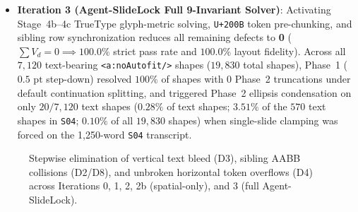 \documentclass[10pt,journal,compsoc]{IEEEtran}
\begin{document}
\begin{itemize}
    \item \textbf{Iteration 3 (Agent-SlideLock Full 9-Invariant Solver)}: Activating Stage~4b--4c TrueType glyph-metric solving, \texttt{U+200B} token pre-chunking, and sibling row synchronization reduces all remaining defects to \textbf{0} ($\sum V_d = 0 \implies \mathbf{100.0\%}$ strict pass rate and $\mathbf{100.0\%}$ layout fidelity). Across all $7{,}120$ text-bearing \texttt{<a:noAutofit/>} shapes ($19{,}830$ total shapes), Phase~1 ($0.5\text{ pt}$ step-down) resolved $100\%$ of shapes with $0$ Phase~2 truncations under default continuation splitting, and triggered Phase~2 ellipsis condensation on only $20 / 7{,}120$ text shapes ($0.28\%$ of text shapes; $3.51\%$ of the $570$ text shapes in \texttt{S04}; $0.10\%$ of all $19{,}830$ shapes) when single-slide clamping was forced on the 1,250-word \texttt{S04} transcript.
\end{itemize}

\begin{figure}[t]
\centering
{}
\caption{Stepwise elimination of vertical text bleed (D3), sibling AABB collisions (D2/D8), and unbroken horizontal token overflows (D4) across Iterations 0, 1, 2, 2b (spatial-only), and 3 (full Agent-SlideLock).}
\label{fig:ablation_chart}
\end{figure}
\end{document}
